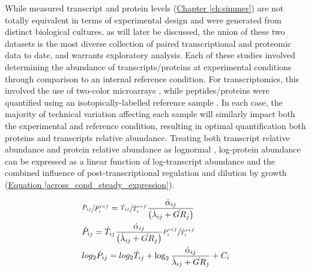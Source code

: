 While measured transcript \cite{Brauer:2008jn} and protein levels (\hyperref[ch:simmer]{Chapter \ref{ch:simmer}}) are not totally equivalent in terms of experimental design and were generated from distinct biological cultures, as will later be discussed, the union of these two datasets is the most diverse collection of paired transcriptional and proteomic data to date, and warrants exploratory analysis.  Each of these studies involved determining the abundance of transcripts/proteins at experimental conditions through comparison to an internal reference condition. For transcriptomics, this involved the use of two-color microarrays \cite{Quackenbush:2002kl}, while peptides/proteins were quantified using an isotopically-labelled reference sample \cite{Ong:2002tf, Costenoble:2011hia}.  In each case, the majority of technical variation affecting each sample will similarly impact both the experimental and reference condition, resulting in optimal quantification both proteins and transcripts relative abundance. Treating both transcript relative abundance and protein relative abundance as lognormal \cite{Quackenbush:2002kl, Cox:2008ir}, log-protein abundance can be expressed as a linear function of log-transcript abundance and the combined influence of post-transcriptional regulation and dilution by growth (\hyperref[across_cond_steady_expression]{Equation \ref{across_cond_steady_expression}}).

\begin{align}
&\sfrac{\dot{P}_{ij}}{\dot{P}^{ref}_{i}} = \sfrac{\dot{T}_{ij}}{\dot{T}^{ref}_{i}}\frac{\dot{\alpha}_{ij}}{\left(\dot{\lambda}_{ij} + \dot{GR}_{j}\right)}\notag\\
&\dot{P}_{ij} = \dot{T}_{ij}\frac{\dot{\alpha}_{ij}}{\left(\dot{\lambda}_{ij} + \dot{GR}_{j}\right)}\sfrac{\dot{P}^{ref}_{i}}{\dot{T}^{ref}_{i}}\notag\\
&log_{2}\dot{P}_{ij} = log_{2}\dot{T}_{ij} + \log_{2}\frac{\dot{\alpha}_{ij}}{\dot{\lambda}_{ij} + \dot{GR}_{j}} + C_{i}\label{across_cond_steady_expression}
\end{align}

